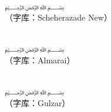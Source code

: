 \begin{note}
\begin{center}
        ~\\
        {\rm \Huge {} ﷽}\nopagebreak\\
        （字库：Scheherazade New）

        ~\\
        {\rm \Huge {} ﷽}\nopagebreak\\
        （字库：Almarai）

        ~\\
        {\rm \huge {} ﷽}\nopagebreak\\
        （字库：Gulzar）


        ~\\
    \end{center}
    
\end{note}
